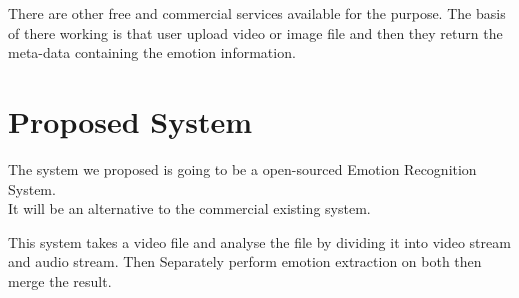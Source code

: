There are other free and commercial services available for the purpose. The basis of there working is that user upload video or image file and then they return the meta-data containing the emotion information.

\section{Proposed System}
The system we proposed is going to be a open-sourced Emotion Recognition System.\\
It will be an alternative to the commercial existing system.

This system takes a video file and analyse the file by dividing it into video stream and audio stream. Then Separately perform emotion extraction on both then merge the result.
